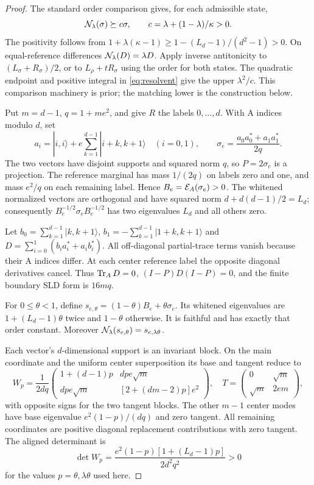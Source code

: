 \begin{proof}
The standard order comparison gives, for each admissible state,
\[
 \mathcal N_\lambda(\sigma)\succeq c\sigma,\qquad c=\lambda+(1-\lambda)/\kappa>0.
\]
The positivity follows from \(1+\lambda(\kappa-1)\ge1-(L_d-1)/(d^2-1)>0\).
On equal-reference differences \(\mathcal N_\lambda(D)=\lambda D\). Apply inverse antitonicity to \((L_\sigma+R_\sigma)/2\), or to \(L_\rho+tR_\sigma\) using the order for both states. The quadratic endpoint and positive integral in \eqref{eq:resolvent} give the upper \(\lambda^2/c\). This comparison machinery is prior; the matching lower is the construction below.

Put \(m=d-1\), \(q=1+me^2\), and give \(R\) the labels \(0,\ldots,d\). With A indices modulo \(d\), set
\[
 a_i=|i,i\rangle+e\sum_{k=1}^{d-1}|i+k,k+1\rangle\quad(i=0,1),\qquad
 \sigma_e=\frac{a_0a_0^*+a_1a_1^*}{2q}.
\]
The two vectors have disjoint supports and squared norm \(q\), so \(P=2\sigma_e\) is a projection. The reference marginal has mass \(1/(2q)\) on labels zero and one, and mass \(e^2/q\) on each remaining label. Hence \(B_e=\mathcal E_A(\sigma_e)>0\).
The whitened normalized vectors are orthogonal and have squared norm
\(d+d(d-1)/2=L_d\); consequently \(B_e^{-1/2}\sigma_e B_e^{-1/2}\) has two eigenvalues \(L_d\) and all others zero.

Let \(b_0=\sum_{k=1}^{d-1}|k,k+1\rangle\), \(b_1=-\sum_{k=1}^{d-1}|1+k,k+1\rangle\) and
\(D=\sum_{i=0}^1(b_i a_i^*+a_i b_i^*)\). All off-diagonal partial-trace terms vanish because their A indices differ. At each center reference label the opposite diagonal derivatives cancel. Thus \(\operatorname{Tr}_AD=0\), \((I-P)D(I-P)=0\), and the finite boundary SLD form is \(16mq\).

For \(0\le\theta<1\), define \(s_{e,\theta}=(1-\theta)B_e+\theta\sigma_e\). Its whitened eigenvalues are \(1+(L_d-1)\theta\) twice and \(1-\theta\) otherwise. It is faithful and has exactly that order constant. Moreover
\(\mathcal N_\lambda(s_{e,\theta})=s_{e,\lambda\theta}\).

Each vector's \(d\)-dimensional support is an invariant block. On the main coordinate and the uniform center superposition its base and tangent reduce to
\[
 W_p=\frac1{2dq}\begin{pmatrix}
 1+(d-1)p&dpe\sqrt m\\dpe\sqrt m&[2+(dm-2)p]e^2
 \end{pmatrix},\quad
 T=\begin{pmatrix}0&\sqrt m\\\sqrt m&2em\end{pmatrix},
\]
with opposite signs for the two tangent blocks. The other \(m-1\) center modes have base eigenvalue \(e^2(1-p)/(dq)\) and zero tangent. All remaining coordinates are positive diagonal replacement contributions with zero tangent. The aligned determinant is
\[
 \det W_p=\frac{e^2(1-p)[1+(L_d-1)p]}{2d^2q^2}>0
\]
for the values \(p=\theta,\lambda\theta\) used here.


\end{proof}
